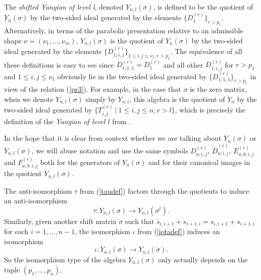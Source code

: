 \documentclass[twoside,12pt,reqno]{amsart}
\makeatletter
\newif\ifcenters@
\def\C{{\mathbb C}}
\makeatother
\begin{document}
The {\em shifted Yangian of level l}, 
denoted $Y_{n,l}(\sigma)$,
is defined to be the quotient of $Y_n(\sigma)$ by the
two-sided ideal generated by the elements
$\{D_1^{(r)}\}_{r > p_1}$.
Alternatively, in terms of the parabolic presentation 
relative to an admissible shape $\nu = (\nu_1,\dots,\nu_m)$,
$Y_{n,l}(\sigma)$ is the quotient of $Y_n(\sigma)$
by the two-sided
ideal generated by the elements
$\{D_{1;i,j}^{(r)}\}_{1 \leq i,j \leq \nu_1, r > p_1}$.
The equivalence of all these definitions is easy to see
since $D_{1;1,1}^{(r)} = D_1^{(r)}$ and 
all other $D_{1;i,j}^{(r)}$ for $r > p_1$ 
and $1 \leq i,j \leq \nu_1$
obviously lie in the two-sided
ideal generated by $\{D_{1;1,1}^{(r)}\}_{r > p_1}$ 
in view of the relation (\ref{pr3}).
For example, in the case that $\sigma$ is the zero matrix, when
we denote $Y_{n,l}(\sigma)$ simply by $Y_{n,l}$, this algebra
is the quotient of $Y_n$ by the two-sided ideal generated
by $\{T_{i,j}^{(r)}\:|\:1 \leq i,j \leq n, r > l\}$,
which is precisely the definition of the 
{\em Yangian of level $l$} from \cite{Ch}.
\iffalse
By convention, we also write 
$Y_{0,0} = Y_{0,0}(\sigma)$ for the trivial algebra $\C$.
\fi

In the hope that it is clear from context whether we are talking about
$Y_n(\sigma)$ or $Y_{n,l}(\sigma)$, we will abuse notation
and use the same symbols
$D_{a;i,j}^{(r)}$,
$\widetilde{D}_{a;i,j}^{(r)}$,
$E_{a,b;i,j}^{(r)}$ and $F_{a,b;i,j}^{(r)}$
both for the generators 
of $Y_n(\sigma)$ and for their canonical images in 
the quotient $Y_{n,l}(\sigma)$.
\ifcenters@ 
Similarly we
use the same notation 
$C_n^{(r)}$ for the images in 
$Y_{n,l}(\sigma)$ of the central elements of $Y_n(\sigma)$
from (\ref{centelts});
clearly these are also central in 
$Y_{n,l}(\sigma)$.
\fi
The anti-isomorphism $\tau$ from (\ref{taudef})
factors through the quotients to induce an anti-isomorphism
\begin{equation}
\tau:Y_{n,l}(\sigma) \rightarrow Y_{n,l}(\sigma^t).
\end{equation}
Similarly, 
given another shift matrix $\dot\sigma$ 
such that $\dot s_{i,i+1}+\dot s_{i+1,i} = s_{i,i+1}+s_{i+1,i}$
for each $i=1,\dots,n-1$,
the isomorphism $\iota$ from (\ref{iotadef}) induces 
an isomorphism 
\begin{equation}\label{iotadef2}
\iota:Y_{n,l}(\sigma) \rightarrow Y_{n,l}(\dot\sigma).
\end{equation}
So the isomorphism type of 
the algebra $Y_{n,l}(\sigma)$ only actually depends on the
tuple $(p_1,\dots,p_n)$.
\end{document}
